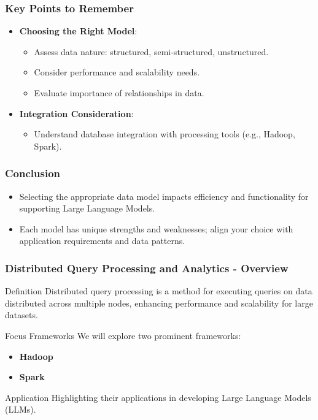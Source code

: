 \documentclass[aspectratio=169]{beamer}
\begin{document}
\begin{frame}[fragile]
    \frametitle{Key Points to Remember}
    \begin{itemize}
        \item \textbf{Choosing the Right Model}:
            \begin{itemize}
                \item Assess data nature: structured, semi-structured, unstructured.
                \item Consider performance and scalability needs.
                \item Evaluate importance of relationships in data.
            \end{itemize}
        \item \textbf{Integration Consideration}:
            \begin{itemize}
                \item Understand database integration with processing tools (e.g., Hadoop, Spark).
            \end{itemize}
    \end{itemize}
\end{frame}

\begin{frame}[fragile]
    \frametitle{Conclusion}
    \begin{itemize}
        \item Selecting the appropriate data model impacts efficiency and functionality for supporting Large Language Models.
        \item Each model has unique strengths and weaknesses; align your choice with application requirements and data patterns.
    \end{itemize}
\end{frame}

\begin{frame}[fragile]
    \frametitle{Distributed Query Processing and Analytics - Overview}
    \begin{block}{Definition}
        Distributed query processing is a method for executing queries on data distributed across multiple nodes, enhancing performance and scalability for large datasets.
    \end{block}
    \begin{block}{Focus Frameworks}
        We will explore two prominent frameworks:
        \begin{itemize}
            \item \textbf{Hadoop}
            \item \textbf{Spark}
        \end{itemize}
    \end{block}
    \begin{block}{Application}
        Highlighting their applications in developing Large Language Models (LLMs).
    \end{block}
\end{frame}
\end{document}
